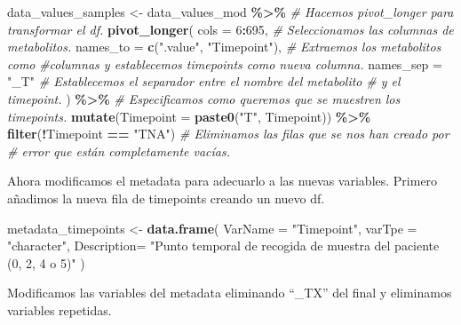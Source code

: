 \documentclass[
]{article}
\newenvironment{Shaded}{\begin{snugshade}}{\end{snugshade}}
\newcommand{\AttributeTok}[1]{\textcolor[rgb]{0.13,0.29,0.53}{#1}}
\newcommand{\CommentTok}[1]{\textcolor[rgb]{0.56,0.35,0.01}{\textit{#1}}}
\newcommand{\ConstantTok}[1]{\textcolor[rgb]{0.56,0.35,0.01}{#1}}
\newcommand{\DecValTok}[1]{\textcolor[rgb]{0.00,0.00,0.81}{#1}}
\newcommand{\FunctionTok}[1]{\textcolor[rgb]{0.13,0.29,0.53}{\textbf{#1}}}
\newcommand{\NormalTok}[1]{#1}
\newcommand{\OtherTok}[1]{\textcolor[rgb]{0.56,0.35,0.01}{#1}}
\newcommand{\SpecialCharTok}[1]{\textcolor[rgb]{0.81,0.36,0.00}{\textbf{#1}}}
\newcommand{\StringTok}[1]{\textcolor[rgb]{0.31,0.60,0.02}{#1}}
\begin{document}
\begin{Shaded}
\begin{Highlighting}[]
\NormalTok{data\_values\_samples }\OtherTok{\textless{}{-}}\NormalTok{ data\_values\_mod }\SpecialCharTok{\%\textgreater{}\%}
  \CommentTok{\# Hacemos pivot\_longer para transformar el df.}
  \FunctionTok{pivot\_longer}\NormalTok{(}
    \AttributeTok{cols =} \DecValTok{6}\SpecialCharTok{:}\DecValTok{695}\NormalTok{, }\CommentTok{\# Seleccionamos las columnas de metabolitos.}
    \AttributeTok{names\_to =} \FunctionTok{c}\NormalTok{(}\StringTok{".value"}\NormalTok{, }\StringTok{"Timepoint"}\NormalTok{), }\CommentTok{\# Extraemos los metabolitos como }
    \CommentTok{\#columnas y establecemos timepoints como nueva columna.}
    \AttributeTok{names\_sep =} \StringTok{"\_T"} \CommentTok{\# Establecemos el separador entre el nombre del metabolito}
    \CommentTok{\# y el timepoint.}
\NormalTok{  ) }\SpecialCharTok{\%\textgreater{}\%}
  \CommentTok{\# Especificamos como queremos que se muestren los timepoints.}
  \FunctionTok{mutate}\NormalTok{(}\AttributeTok{Timepoint =} \FunctionTok{paste0}\NormalTok{(}\StringTok{"T"}\NormalTok{, Timepoint)) }\SpecialCharTok{\%\textgreater{}\%} 
  \FunctionTok{filter}\NormalTok{(}\SpecialCharTok{!}\NormalTok{Timepoint }\SpecialCharTok{==} \StringTok{"TNA"}\NormalTok{) }\CommentTok{\# Eliminamos las filas que se nos han creado por }
\CommentTok{\# error que están completamente vacías.}
\end{Highlighting}
\end{Shaded}

Ahora modificamos el metadata para adecuarlo a las nuevas variables.
Primero añadimos la nueva fila de timepoints creando un nuevo df.

\begin{Shaded}
\begin{Highlighting}[]
\NormalTok{metadata\_timepoints }\OtherTok{\textless{}{-}} \FunctionTok{data.frame}\NormalTok{(}
  \AttributeTok{VarName =} \StringTok{"Timepoint"}\NormalTok{,}
  \AttributeTok{varTpe =} \StringTok{"character"}\NormalTok{,}
  \AttributeTok{Description=} \StringTok{"Punto temporal de recogida de muestra del paciente (0, 2, 4 o 5)"}
\NormalTok{)}
\end{Highlighting}
\end{Shaded}

Modificamos las variables del metadata eliminando ``\_TX'' del final y
eliminamos variables repetidas.

\begin{Shaded}
\end{Shaded}
\end{document}
